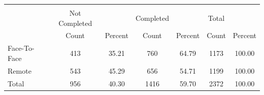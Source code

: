 {
\def\sym#1{\ifmmode^{#1}\else\(^{#1}\)\fi}
\begin{tabular}{l*{3}{cc}}
\hline\hline
            &\multicolumn{6}{c}{}                                                                           \\
            &  Not Completed&               &      Completed&               &          Total&               \\
            &          Count&        Percent&          Count&        Percent&          Count&        Percent\\
\hline
Face-To-Face&            413&          35.21&            760&          64.79&           1173&         100.00\\
Remote      &            543&          45.29&            656&          54.71&           1199&         100.00\\
Total       &            956&          40.30&           1416&          59.70&           2372&         100.00\\
\hline\hline
\end{tabular}
}
